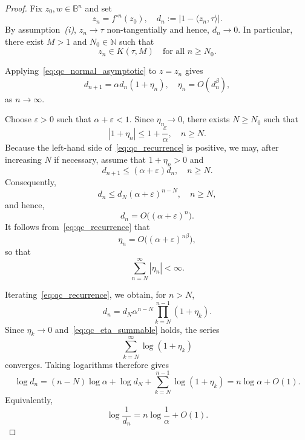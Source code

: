 \documentclass[12pt]{amsart}
\numberwithin{equation}{section}
\theoremstyle{plain}
\theoremstyle{definition}
\begin{document}
\begin{proof}
Fix $z_0,w\in\mathbb{B}^n$ and set
\begin{equation*}
z_n=f^{\circ n}(z_0),
\quad
d_n:=|1-\langle z_n,\tau\rangle|.
\end{equation*}
By assumption~\emph{(i)}, $z_n\to\tau$ non-tangentially and hence,
$d_n\to0$. In particular, there exist $M>1$ and $N_0\in\mathbb{N}$
such that
\begin{equation*}
z_n\in K(\tau,M)
\quad\text{for all }n\geq N_0.
\end{equation*}

Applying~\eqref{eq:qc_normal_asymptotic} to $z=z_n$ gives
\begin{equation}
\label{eq:qc_recurrence}
d_{n+1}
=
\alpha d_n(1+\eta_n),
\quad
\eta_n=O(d_n^\beta),
\end{equation}
as $n\to\infty$.

Choose $\varepsilon>0$ such that
$\alpha+\varepsilon<1$. Since $\eta_n\to0$, there exists
$N\geq N_0$ such that
\begin{equation*}
|1+\eta_n|\leq 1+\frac{\varepsilon}{\alpha},
\quad n\geq N.
\end{equation*}
Because the left-hand side of~\eqref{eq:qc_recurrence} is positive,
we may, after increasing $N$ if necessary, assume that
$1+\eta_n>0$ and
\begin{equation*}
d_{n+1}\leq(\alpha+\varepsilon)d_n,
\quad n\geq N.
\end{equation*}
Consequently,
\begin{equation*}
d_n
\leq
d_N(\alpha+\varepsilon)^{n-N},
\quad n\geq N,
\end{equation*}
and hence,
\begin{equation*}
\label{eq:qc_dn_decay}
d_n=O\bigl((\alpha+\varepsilon)^n\bigr).
\end{equation*}
It follows from~\eqref{eq:qc_recurrence} that
\begin{equation*}
\label{eq:qc_eta_decay}
\eta_n
=
O\bigl((\alpha+\varepsilon)^{n\beta}\bigr),
\end{equation*}
so that
\begin{equation}
\label{eq:qc_eta_summable}
\sum_{n=N}^{\infty}|\eta_n|<\infty.
\end{equation}

Iterating~\eqref{eq:qc_recurrence}, we obtain, for $n>N$,
\begin{equation*}
d_n
=
d_N\alpha^{n-N}
\prod_{k=N}^{n-1}(1+\eta_k).
\end{equation*}
Since $\eta_k\to0$ and~\eqref{eq:qc_eta_summable} holds, the series
\begin{equation*}
\sum_{k=N}^{\infty}\log(1+\eta_k)
\end{equation*}
converges. Taking logarithms therefore gives
\begin{equation*}
\log d_n
=
(n-N)\log\alpha
+
\log d_N
+
\sum_{k=N}^{n-1}\log(1+\eta_k)
=
n\log\alpha+O(1).
\end{equation*}
Equivalently,
\begin{equation}
\label{eq:qc_boundary_rate}
\log\frac{1}{d_n}
=
n\log\frac{1}{\alpha}+O(1).
\end{equation}


\end{proof}
\end{document}
